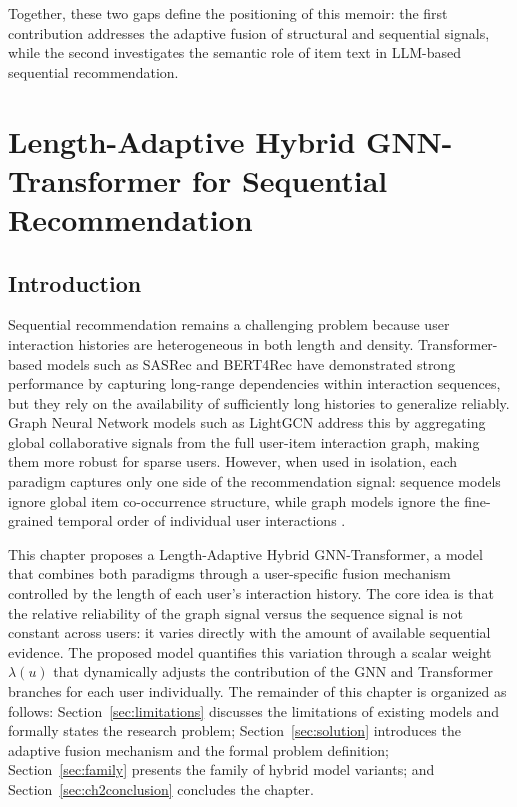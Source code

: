 \documentclass[12pt,a4paper]{report}
\begin{document}
Together, these two gaps define the positioning of this memoir: the first
contribution addresses the adaptive fusion of structural and sequential signals,
while the second investigates the semantic role of item text in LLM-based
sequential recommendation.

\chapter{Length-Adaptive Hybrid GNN-Transformer for Sequential Recommendation}

\section{Introduction}

Sequential recommendation remains a challenging problem because user interaction
histories are heterogeneous in both length and density. Transformer-based models
such as SASRec \citep{kang2018sasrec} and BERT4Rec \citep{sun2019bert4rec} have
demonstrated strong performance by capturing long-range dependencies within
interaction sequences, but they rely on the availability of sufficiently long
histories to generalize reliably. Graph Neural Network models such as LightGCN
\citep{he2020lightgcn} address this by aggregating global collaborative signals
from the full user-item interaction graph, making them more robust for sparse
users. However, when used in isolation, each paradigm captures only one side of
the recommendation signal: sequence models ignore global item co-occurrence
structure, while graph models ignore the fine-grained temporal order of
individual user interactions \citep{wu2020gnnsurvey, pan2024survey}.

This chapter proposes a Length-Adaptive Hybrid GNN-Transformer, a model that
combines both paradigms through a user-specific fusion mechanism controlled by
the length of each user's interaction history. The core idea is that the
relative reliability of the graph signal versus the sequence signal is not
constant across users: it varies directly with the amount of available
sequential evidence. The proposed model quantifies this variation through a
scalar weight \(\lambda(u)\) that dynamically adjusts the contribution of the
GNN and Transformer branches for each user individually. The remainder of this
chapter is organized as follows: Section~\ref{sec:limitations} discusses the
limitations of existing models and formally states the research problem;
Section~\ref{sec:solution} introduces the adaptive fusion mechanism and the
formal problem definition; Section~\ref{sec:family} presents the family of
hybrid model variants; and Section~\ref{sec:ch2conclusion} concludes the
chapter.
\end{document}
